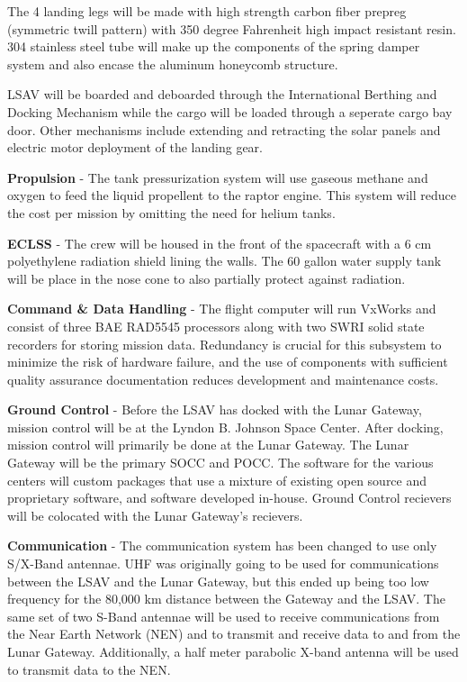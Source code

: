 \documentclass[10pt]{article}
\begin{document}
The 4 landing legs will be made with high strength carbon fiber
prepreg (symmetric twill pattern) with 350 degree Fahrenheit high
impact resistant resin.  304 stainless steel tube will make up the
components of the spring damper system and also encase the aluminum
honeycomb structure.

LSAV will be boarded and deboarded through the International Berthing
and Docking Mechanism while the cargo will be loaded through a
seperate cargo bay door.  Other mechanisms include extending and
retracting the solar panels and electric motor deployment of the
landing gear.

\textbf{Propulsion} - The tank pressurization system will use gaseous methane
and oxygen to feed the liquid propellent to the raptor engine. This
system will reduce the cost per mission by omitting the need for
helium tanks.

\textbf{ECLSS} - The crew will be housed in the front of the
spacecraft with a 6 cm polyethylene radiation shield lining the
walls. The 60 gallon water supply tank will be place in the nose cone
to also partially protect against radiation. 

\textbf{Command \& Data Handling} - The flight computer will run
VxWorks and consist of three BAE RAD5545 processors along with two
SWRI solid state recorders for storing mission data. Redundancy is
crucial for this subsystem to minimize the risk of hardware failure,
and the use of components with sufficient quality assurance
documentation reduces development and maintenance costs.

\textbf{Ground Control} - Before the LSAV has docked with the Lunar
Gateway, mission control will be at the Lyndon B. Johnson Space
Center. After docking, mission control will primarily be done at the
Lunar Gateway. The Lunar Gateway will be the primary SOCC and
POCC. The software for the various centers will custom packages that
use a mixture of existing open source and proprietary software, and
software developed in-house. Ground Control recievers will be
colocated with the Lunar Gateway's recievers.

\textbf{Communication} - The communication system has been changed to
use only S/X-Band antennae. UHF was originally going to be used for
communications between the LSAV and the Lunar Gateway, but this ended
up being too low frequency for the 80,000 km distance between the
Gateway and the LSAV. The same set of two S-Band antennae will be used
to receive communications from the Near Earth Network (NEN) and to
transmit and receive data to and from the Lunar Gateway. Additionally,
a half meter parabolic X-band antenna will be used to transmit data to
the NEN.
\end{document}
